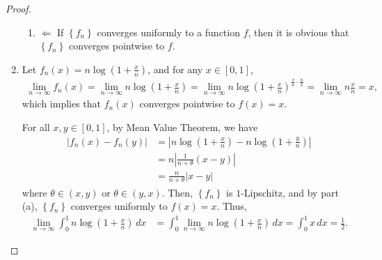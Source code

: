 \documentclass[11pt]{article}
\theoremstyle{definition}
\numberwithin{equation}{subsection}
\begin{document}
\begin{proof}
\begin{enumerate}[label=(\alph*)]
\begin{enumerate}[label=\arabic*)]
        \item $\Leftarrow$ If $\left\{f_n\right\}$ converges uniformly to a function $f$, then it is obvious that $\left\{f_n\right\}$ converges pointwise to $f$.
    \end{enumerate}
    
    \item Let $f_n(x) = n \log \left(1 + \frac{x}{n}\right)$, and for any $x \in [0,1]$,
    \begin{align*}
        \lim_{n \to \infty} f_n(x) = \lim_{n \to \infty} n \log \left(1 + \frac{x}{n}\right) = \lim_{n \to \infty} n \log \left(1 + \frac{x}{n}\right)^{\frac{x}{n} \cdot \frac{n}{x}} = \lim_{n \to \infty} n \frac{x}{n} = x,
    \end{align*}
    which implies that $f_n(x)$ converges pointwise to $f(x) = x$. 
    
    For all $x , y \in [0,1]$, by Mean Value Theorem, we have
    \begin{align*}
        |f_n(x) - f_n(y)| & = \left|n \log \left(1 + \frac{x}{n}\right) - n \log \left(1 + \frac{y}{n}\right) \right| \\
        & = n \left| \frac{1}{n + \theta} (x - y) \right| \\
        & = \frac{n}{n + \theta} |x - y|
    \end{align*}
    where $\theta \in (x,y)$ or $\theta \in (y,x)$. Then, $\left\{f_n\right\}$ is $1$-Lipschitz, and by part (a), $\left\{f_n\right\}$ converges uniformly to $f(x) = x$. Thus,
    \begin{align*}
        \lim_{n \to \infty} \int^1_0 n \log \left(1 + \frac{x}{n}\right)\, dx & =  \int^1_0 \lim_{n \to \infty} n \log \left(1 + \frac{x}{n}\right)\, dx = \int^1_0 x \, dx = \frac{1}{2}.
    \end{align*}
\end{enumerate}
\end{proof}

\medskip
\end{document}
